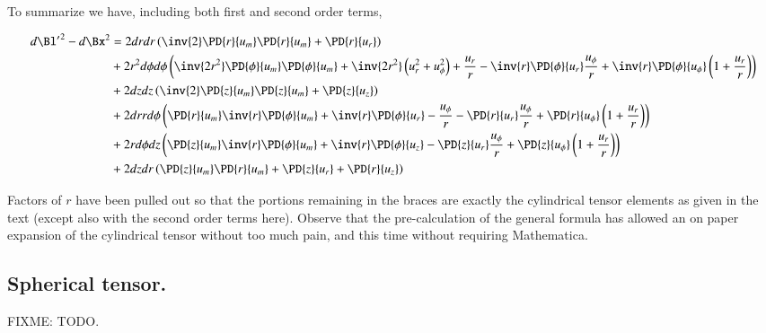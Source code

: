 To summarize we have, including both first and second order terms,

\begin{equation}\label{eqn:continuumL2:n}
\begin{aligned}
{d\Bl'}^2 - d\Bx^2
&=
2 dr dr 
\left( 
\inv{2}
\PD{r}{u_m} 
\PD{r}{u_m} 
+
\PD{r}{u_r} 
\right) \\
&+
2 r^2 d\phi d\phi 
\left( 
\inv{2 r^2}
\PD{\phi}{u_m} 
\PD{\phi}{u_m} 
+ 
\inv{2 r^2} \left( u_r^2 + u_\phi^2 \right) 
+ \frac{u_r}{r}
-
\inv{r}
\PD{\phi}{u_r}
\frac{u_\phi}{r}
+
\inv{r}
\PD{\phi}{u_\phi}\left(
1
+
\frac{u_r}{r}
\right)
\right) \\
&+
2 dz dz 
\left( 
\inv{2}
\PD{z}{u_m} 
\PD{z}{u_m} 
+
\PD{z}{u_z} 
\right) \\
&+2 dr r d\phi 
\left( 
\PD{r}{u_m} 
\inv{r}
\PD{\phi}{u_m} 
+
\inv{r}
\PD{\phi}{u_r} 
-
\frac{u_\phi}{r}
-
\PD{r}{u_r}
\frac{u_\phi}{r}
+
\PD{r}{u_\phi}\left(
1 
+
\frac{u_r}{r}
\right)
\right) \\
&+2 r d\phi dz 
\left( 
\PD{z}{u_m} 
\inv{r}
\PD{\phi}{u_m} 
+
\inv{r}
\PD{\phi}{u_z} 
-
\PD{z}{u_r}
\frac{u_\phi}{r}
+
\PD{z}{u_\phi}\left(
1
+
\frac{u_r}{r}
\right)
\right) 
\\
&+2 dz dr 
\left( 
\PD{z}{u_m} 
\PD{r}{u_m} 
+
\PD{z}{u_r} 
+
\PD{r}{u_z} 
\right)
\end{aligned}
\end{equation}

Factors of $r$ have been pulled out so that the portions remaining in the braces are exactly the cylindrical tensor elements as given in the text (except also with the second order terms here).  Observe that the pre-calculation of the general formula has allowed an on paper expansion of the cylindrical tensor without too much pain, and this time without requiring Mathematica.

\subsection{Spherical tensor.}

FIXME: TODO.

\EndArticle
